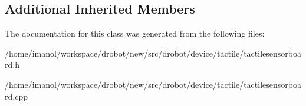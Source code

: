 \subsection*{Additional Inherited Members}


The documentation for this class was generated from the following files\-:\begin{DoxyCompactItemize}
\item 
/home/imanol/workspace/drobot/new/src/drobot/device/tactile/tactilesensorboard.\-h\item 
/home/imanol/workspace/drobot/new/src/drobot/device/tactile/tactilesensorboard.\-cpp\end{DoxyCompactItemize}
